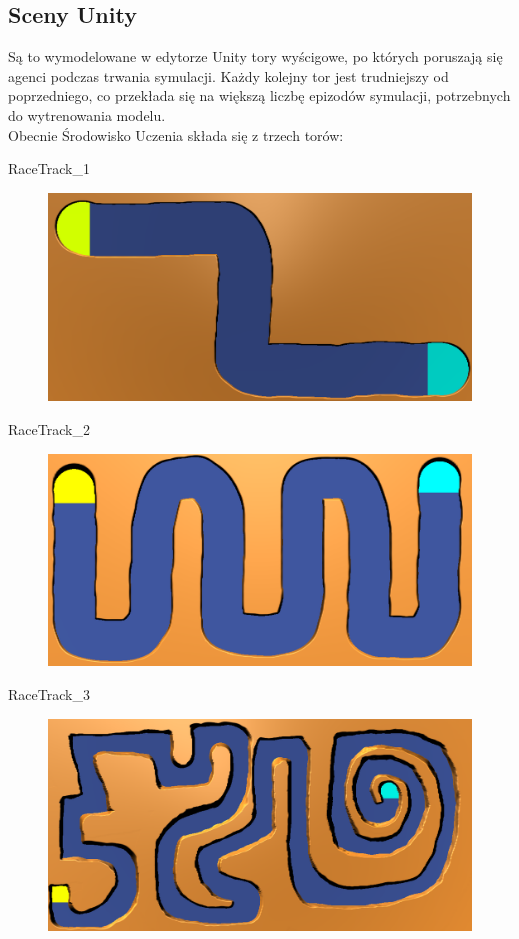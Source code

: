 \subsection{Sceny Unity}
Są to wymodelowane w edytorze Unity tory wyścigowe, po których poruszają się agenci podczas trwania symulacji. 
Każdy kolejny tor jest trudniejszy od poprzedniego, co przekłada się na większą liczbę epizodów symulacji, potrzebnych do wytrenowania modelu. \\
Obecnie Środowisko Uczenia składa się z trzech torów:
\newpage
\begin{enumerate*}
\item RaceTrack\_1
\begin{figure}[H]
\centering
\includegraphics[width=13cm]{resources/figures/track_1.png}
\end{figure}
\item RaceTrack\_2
\begin{figure}[H]
\centering
\includegraphics[width=13cm]{resources/figures/track_2.png}
\end{figure}
\item RaceTrack\_3
\begin{figure}[H]
\centering
\includegraphics[width=13cm]{resources/figures/track_3.png}
\end{figure}
\end{enumerate*}

